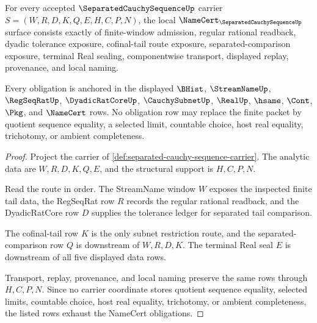 \begin{theorem}
\label{thm:separated-cauchy-sequence-namecert-obligations}
For every accepted $\SeparatedCauchySequenceUp$ carrier $S=(W,R,D,K,Q,E,H,C,P,N)$, the local $\NameCert_{\SeparatedCauchySequenceUp}$ surface consists exactly of finite-window admission, regular rational readback, dyadic tolerance exposure, cofinal-tail route exposure, separated-comparison exposure, terminal Real sealing, componentwise transport, displayed replay, provenance, and local naming.

Every obligation is anchored in the displayed $\BHist$, $\StreamNameUp$, $\RegSeqRatUp$, $\DyadicRatCoreUp$, $\CauchySubnetUp$, $\RealUp$, $\hsame$, $\Cont$, $\Pkg$, and $\NameCert$ rows. No obligation row may replace the finite packet by quotient sequence equality, a selected limit, countable choice, host real equality, trichotomy, or ambient completeness.
\end{theorem}
\begin{proof}
Project the carrier of \autoref{def:separated-cauchy-sequence-carrier}. The analytic data are $W,R,D,K,Q,E$, and the structural support is $H,C,P,N$.

Read the route in order. The StreamName window $W$ exposes the inspected finite tail data, the RegSeqRat row $R$ records the regular rational readback, and the DyadicRatCore row $D$ supplies the tolerance ledger for separated tail comparison.

The cofinal-tail row $K$ is the only subnet restriction route, and the separated-comparison row $Q$ is downstream of $W,R,D,K$. The terminal Real seal $E$ is downstream of all five displayed data rows.

Transport, replay, provenance, and local naming preserve the same rows through $H,C,P,N$. Since no carrier coordinate stores quotient sequence equality, selected limits, countable choice, host real equality, trichotomy, or ambient completeness, the listed rows exhaust the NameCert obligations.
\end{proof}

